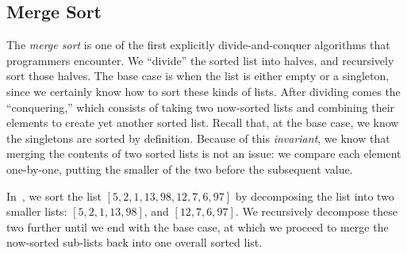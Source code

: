 \newpage
\subsection{Merge Sort}

The \emph{merge sort} is one of the first explicitly divide-and-conquer algorithms that programmers encounter. 
We ``divide'' the sorted list into halves, and recursively sort those halves. 
The base case is when the list is either empty or a singleton, since we certainly know how to sort these kinds of lists. 
After dividing comes the ``conquering,'' which consists of taking two now-sorted lists and combining their elements to create yet another sorted list. 
Recall that, at the base case, we know the singletons are sorted by definition. 
Because of this \emph{invariant}, we know that merging the contents of two sorted lists is not an issue: we compare each element one-by-one, putting the smaller of the two before the subsequent value.

In~, we sort the list $[5, 2, 1, 13, 98, 12, 7, 6, 97]$ by decomposing the list into two smaller lists: $[5, 2, 1, 13, 98]$, and $[12, 7, 6, 97]$. 
We recursively decompose these two further until we end with the base case, at which we proceed to merge the now-sorted sub-lists back into one overall sorted list.

